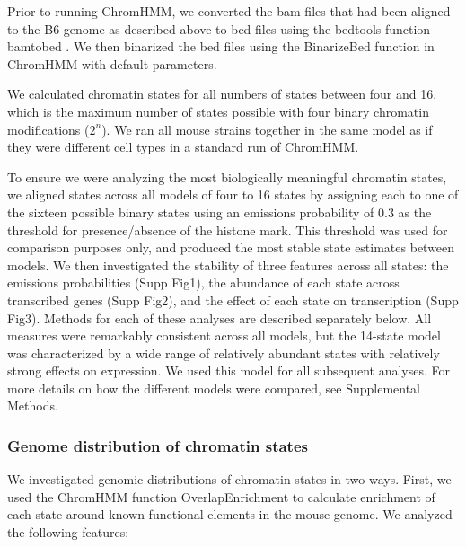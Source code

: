 \documentclass[
  11pt,
]{article}
\begin{document}
Prior to running ChromHMM, we converted the bam files that had been
aligned to the B6 genome as described above to bed files using the
bedtools function bamtobed \citep{quinlan2010bedtools}. We then
binarized the bed files using the BinarizeBed function in ChromHMM with
default parameters.

We calculated chromatin states for all numbers of states between four
and 16, which is the maximum number of states possible with four binary
chromatin modifications (\(2^n\)). We ran all mouse strains together in
the same model as if they were different cell types in a standard run of
ChromHMM.

To ensure we were analyzing the most biologically meaningful chromatin
states, we aligned states across all models of four to 16 states by
assigning each to one of the sixteen possible binary states using an
emissions probability of 0.3 as the threshold for presence/absence of
the histone mark. This threshold was used for comparison purposes only,
and produced the most stable state estimates between models. We then
investigated the stability of three features across all states: the
emissions probabilities (Supp Fig1), the abundance of each state across
transcribed genes (Supp Fig2), and the effect of each state on
transcription (Supp Fig3). Methods for each of these analyses are
described separately below. All measures were remarkably consistent
across all models, but the 14-state model was characterized by a wide
range of relatively abundant states with relatively strong effects on
expression. We used this model for all subsequent analyses. For more
details on how the different models were compared, see Supplemental
Methods.

\hypertarget{genome-distribution-of-chromatin-states}{%
\subsubsection{Genome distribution of chromatin
states}\label{genome-distribution-of-chromatin-states}}

We investigated genomic distributions of chromatin states in two ways.
First, we used the ChromHMM function OverlapEnrichment to calculate
enrichment of each state around known functional elements in the mouse
genome. We analyzed the following features:
\end{document}
